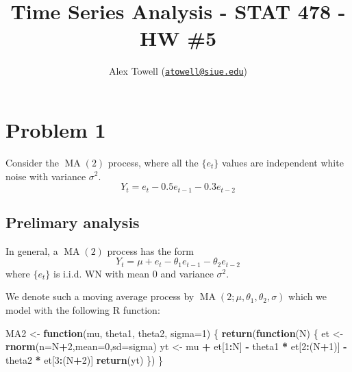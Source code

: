 \documentclass[
]{article}
\title{Time Series Analysis - STAT 478 - HW \#5}
\author{Alex Towell
(\href{mailto:atowell@siue.edu}{\nolinkurl{atowell@siue.edu}})}
\date{}
\newenvironment{Shaded}{\begin{snugshade}}{\end{snugshade}}
\newcommand{\AttributeTok}[1]{\textcolor[rgb]{0.13,0.29,0.53}{#1}}
\newcommand{\ControlFlowTok}[1]{\textcolor[rgb]{0.13,0.29,0.53}{\textbf{#1}}}
\newcommand{\DecValTok}[1]{\textcolor[rgb]{0.00,0.00,0.81}{#1}}
\newcommand{\FunctionTok}[1]{\textcolor[rgb]{0.13,0.29,0.53}{\textbf{#1}}}
\newcommand{\NormalTok}[1]{#1}
\newcommand{\OtherTok}[1]{\textcolor[rgb]{0.56,0.35,0.01}{#1}}
\newcommand{\SpecialCharTok}[1]{\textcolor[rgb]{0.81,0.36,0.00}{\textbf{#1}}}
\begin{document}
\maketitle

\newcommand{\var}{\operatorname{Var}}
\newcommand{\expect}{\operatorname{E}}
\newcommand{\corr}{\operatorname{Corr}}
\newcommand{\cov}{\operatorname{Cov}}
\newcommand{\ssr}{\operatorname{SSR}}
\newcommand{\se}{\operatorname{SE}}
\newcommand{\mat}[1]{\bm{#1}}
\newcommand{\eval}[2]{\left. #1 \right\vert_{#2}}
\newcommand{\argmin}{\operatorname{arg\,min}}

\hypertarget{problem-1}{%
\section{Problem 1}\label{problem-1}}

Consider the \(\operatorname{MA}(2)\) process, where all the \(\{e_t\}\)
values are independent white noise with variance \(\sigma^2\). \[
   Y_t = e_t − 0.5 e_{t−1} − 0.3 e_{t−2}
\]

\hypertarget{prelimary-analysis}{%
\subsection{Prelimary analysis}\label{prelimary-analysis}}

In general, a \(\operatorname{MA}(2)\) process has the form \[
   Y_t = \mu + e_t - \theta_1 e_{t-1} - \theta_2 e_{t-2}
\] where \(\{e_t\}\) is i.i.d. WN with mean \(0\) and variance
\(\sigma^2\).

We denote such a moving average process by
\(\operatorname{MA}(2 ; \mu,\theta_1,\theta_2,\sigma)\) which we model
with the following R function:

\begin{Shaded}
\begin{Highlighting}[]
\NormalTok{MA2 }\OtherTok{\textless{}{-}} \ControlFlowTok{function}\NormalTok{(mu, theta1, theta2, }\AttributeTok{sigma=}\DecValTok{1}\NormalTok{)}
\NormalTok{\{}
   \FunctionTok{return}\NormalTok{(}\ControlFlowTok{function}\NormalTok{(N)}
\NormalTok{   \{}
\NormalTok{      et }\OtherTok{\textless{}{-}} \FunctionTok{rnorm}\NormalTok{(}\AttributeTok{n=}\NormalTok{N}\SpecialCharTok{+}\DecValTok{2}\NormalTok{,}\AttributeTok{mean=}\DecValTok{0}\NormalTok{,}\AttributeTok{sd=}\NormalTok{sigma)}
\NormalTok{      yt }\OtherTok{\textless{}{-}}\NormalTok{ mu }\SpecialCharTok{+}
\NormalTok{            et[}\DecValTok{1}\SpecialCharTok{:}\NormalTok{N] }\SpecialCharTok{{-}}
\NormalTok{            theta1 }\SpecialCharTok{*}\NormalTok{ et[}\DecValTok{2}\SpecialCharTok{:}\NormalTok{(N}\SpecialCharTok{+}\DecValTok{1}\NormalTok{)] }\SpecialCharTok{{-}}
\NormalTok{            theta2 }\SpecialCharTok{*}\NormalTok{ et[}\DecValTok{3}\SpecialCharTok{:}\NormalTok{(N}\SpecialCharTok{+}\DecValTok{2}\NormalTok{)]}
      \FunctionTok{return}\NormalTok{(yt)}
\NormalTok{   \})}
\NormalTok{\}}
\end{Highlighting}
\end{Shaded}
\end{document}
